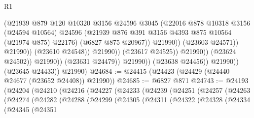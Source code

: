 \begin{lexlean}{R1}
\begin{coremodule}
                                              (@21939
                                                @879
                                                @120
                                                @10320
                                                @3156
                                                @24596
                                                @3045
                                                (@22016
                                                  @878
                                                  @10318
                                                  @3156
                                                  (@24594 @10564)
                                                  @24596
                                                  (@21939
                                                    @876
                                                    @391
                                                    @3156
                                                    @4393
                                                    @875
                                                    @10564
                                                    (@21974 @875)
                                                    @22176)
                                                  (@6827 @875 @20967))
                                                @21990))
                                            (@23603 @24571))
                                          @21990))
                                      (@23610 @24548))
                                    @21990))
                                (@23617 @24525))
                              @21990))
                          (@23624 @24502))
                        @21990))
                    (@23631 @24479))
                  @21990))
              (@23638 @24456))
            @21990))
        (@23645 @24433))
      @21990)
@24684 := @24415 (@24423 (@24429 (@24440 @24677 (@23652 @24408)) @21990))
@24685 := @6827 @871
@24743 := @24193
    (@24204
      (@24210
        (@24216
          (@24227
            (@24233
              (@24239
                (@24251
                  (@24257
                    (@24263
                      (@24274
                        (@24282
                          (@24288
                            (@24299
                              (@24305
                                (@24311
                                  (@24322
                                    (@24328
                                      (@24334
                                        (@24345
                                          (@24351

\end{coremodule}
\end{lexlean}
